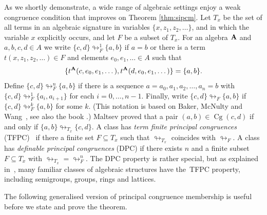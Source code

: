 \documentclass[10pt,a4paper]{amsart}
\theoremstyle{plain}
\theoremstyle{definition}
\newcommand{\collapse}{\looparrowright}
\newcommand{\Cg}{\operatorname{Cg}}
\begin{document}
As we shortly demonstrate, a wide range of algebraic settings enjoy a weak congruence condition that improves on Theorem \ref{thm:sipcm}.  Let $T_x$ be the set of all terms in an algebraic signature in variables $\{x,z_1,z_2,\dots\}$, and in which the variable $x$ explicitly occurs, and let $F$ be a subset of $T_x$.  For an algebra ${\bf A}$ and $a,b,c,d\in A$ we write $\{c,d\}\collapse^1_F\{a,b\}$ if $a=b$ or there is a term $t(x,z_1,z_2,\dots) \in F$ and elements $e_0,e_1,\dots\in A$ such that 
\[
\{t^{\bf A}(c,e_0,e_1,\dots),t^{\bf A}(d,e_0,e_1,\dots)\}=\{a,b\}.
\]  
Define  $\{c,d\}\collapse^{n}_F\{a,b\}$ if there is a sequence $a=a_0,a_1,a_2,\dots,a_n=b$ with $\{c,d\}\collapse_F^1\{a_i,a_{i+1}\}$ for each $i=0,\dots,n-1$.  Finally, write $\{c,d\}\collapse_F\{a,b\}$ if $\{c,d\}\collapse_F^k\{a,b\}$ for some $k$.  
(This notation is based on Baker, McNulty and Wang~\cite{BMW}, see also the book \cite[p.~25]{ALV}.)  Maltsev proved that a pair $(a,b)\in \Cg(c,d)$ if and only if $\{a,b\}\collapse_{T_x}\{c,d\}$.  
A class has \emph{term finite principal congruences} (TFPC)~\cite{CDFJ}  if there a finite set $F\subseteq T_x$ such that $\collapse_{T_x}$ coincides with $\collapse_{F}$.  A class has \emph{definable principal congruences} (DPC) if there exists $n$ and a finite subset $F\subseteq T_x$ with ${\collapse_{T_x}}={\collapse_F^n}$.  
The DPC property is rather special, but as explained in~\cite{CDFJ}, many familiar classes of algebraic structures have the~TFPC property, including semigroups, groups, rings and lattices.  

The following generalised version of \textsf{principal congruence membership} is useful before we state and prove the theorem.

\medskip
\end{document}
